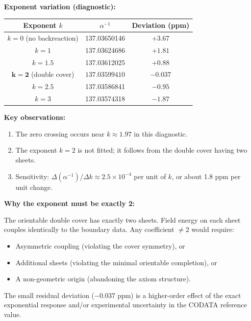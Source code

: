 \textbf{Exponent variation (diagnostic):}
\begin{center}
\begin{tabular}{@{}ccc@{}}
\toprule
\textbf{Exponent $k$} & $\alpha^{-1}$ & \textbf{Deviation (ppm)}\\
\midrule
$k = 0$ (no backreaction) & 137.03650146 & $+3.67$\\
$k = 1$ & 137.03624686 & $+1.81$\\
$k = 1.5$ & 137.03612025 & $+0.88$\\
$\mathbf{k = 2}$ (double cover) & $\mathbf{137.03599410}$ & $\mathbf{-0.037}$\\
$k = 2.5$ & 137.03586841 & $-0.95$\\
$k = 3$ & 137.03574318 & $-1.87$\\
\bottomrule
\end{tabular}
\end{center}

\textbf{Key observations:}
\begin{enumerate}[leftmargin=1.5em, topsep=2pt, itemsep=1pt]
    \item The zero crossing occurs near $k \approx 1.97$ in this diagnostic.
    \item The exponent $k=2$ is not fitted; it follows from the double cover having two sheets.
    \item Sensitivity: $\Delta(\alpha^{-1})/\Delta k \approx 2.5 \times 10^{-4}$ per unit of $k$, 
        or about 1.8 ppm per unit change.
\end{enumerate}

\textbf{Why the exponent must be exactly 2:}

The orientable double cover has exactly two sheets. Field energy on each sheet couples 
identically to the boundary data. Any coefficient $\neq 2$ would require:
\begin{itemize}[leftmargin=1.5em, topsep=2pt, itemsep=1pt]
    \item Asymmetric coupling (violating the cover symmetry), or
    \item Additional sheets (violating the minimal orientable completion), or
    \item A non-geometric origin (abandoning the axiom structure).
\end{itemize}

The small residual deviation ($-0.037$ ppm) is a higher-order effect of the exact
exponential response and/or experimental uncertainty in the CODATA reference value.

